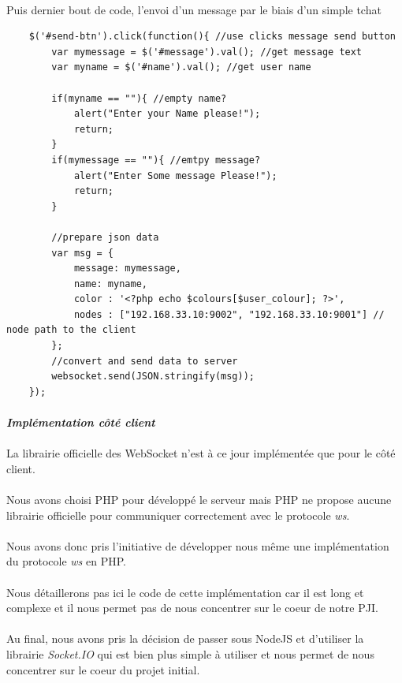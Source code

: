 \documentclass[a4paper,12pt]{report}
\begin{document}
	\paragraph*{}
	Puis dernier bout de code, l'envoi d'un message par le biais d'un simple tchat
	\begin{lstlisting}
	$('#send-btn').click(function(){ //use clicks message send button	
		var mymessage = $('#message').val(); //get message text
		var myname = $('#name').val(); //get user name
		
		if(myname == ""){ //empty name?
			alert("Enter your Name please!");
			return;
		}
		if(mymessage == ""){ //emtpy message?
			alert("Enter Some message Please!");
			return;
		}
		
		//prepare json data
		var msg = {
			message: mymessage,
			name: myname,
			color : '<?php echo $colours[$user_colour]; ?>',
			nodes : ["192.168.33.10:9002", "192.168.33.10:9001"] // node path to the client
		};
		//convert and send data to server
		websocket.send(JSON.stringify(msg));
	});
	\end{lstlisting}	
	\paragraph*{}
	\textit{\textbf{Implémentation côté client}} 
	\paragraph*{}
	La librairie officielle des WebSocket n'est à ce jour implémentée que pour le côté client. 
	\paragraph*{}
	Nous avons choisi PHP pour développé le serveur mais PHP ne propose aucune librairie officielle pour communiquer correctement avec le protocole \emph{ws}. 
	\paragraph*{}
	Nous avons donc pris l'initiative de développer nous même une implémentation du protocole \emph{ws} en PHP.
	\paragraph*{}
	Nous détaillerons pas ici le code de cette implémentation car il est long et complexe et il nous permet pas de nous concentrer sur le coeur de notre PJI.
	\paragraph*{}
	Au final, nous avons pris la décision de passer sous NodeJS et d'utiliser la librairie \emph{Socket.IO} qui est bien plus simple à utiliser et nous permet de nous concentrer sur le coeur du projet initial.
\end{document}
